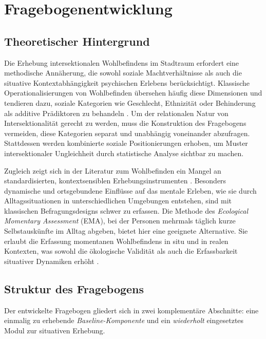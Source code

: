 \section{Fragebogenentwicklung}

\subsection{Theoretischer Hintergrund}

Die Erhebung intersektionalen Wohlbefindens im Stadtraum erfordert eine methodische Annäherung, die sowohl soziale Machtverhältnisse als auch die situative Kontextabhängigkeit psychischen Erlebens berücksichtigt. Klassische Operationalisierungen von Wohlbefinden übersehen häufig diese Dimensionen und tendieren dazu, soziale Kategorien wie Geschlecht, Ethnizität oder Behinderung als additive Prädiktoren zu behandeln \parencite{bauerIntersectionalityQuantitativeResearch2021}. Um der relationalen Natur von Intersektionalität gerecht zu werden, muss die Konstruktion des Fragebogens vermeiden, diese Kategorien separat und unabhängig voneinander abzufragen. Stattdessen werden kombinierte soziale Positionierungen erhoben, um Muster intersektionaler Ungleichheit durch statistische Analyse sichtbar zu machen.

Zugleich zeigt sich in der Literatur zum Wohlbefinden ein Mangel an standardisierten, kontextsensiblen Erhebungsinstrumenten \parencite{bautistaWhatWellbeingScoping2023}. Besonders dynamische und ortsgebundene Einflüsse auf das mentale Erleben, wie sie durch Alltagssituationen in unterschiedlichen Umgebungen entstehen, sind mit klassischen Befragungsdesigns schwer zu erfassen. Die Methode des \emph{Ecological Momentary Assessment} (EMA), bei der Personen mehrmals täglich kurze Selbstauskünfte im Alltag abgeben, bietet hier eine geeignete Alternative. Sie erlaubt die Erfassung momentanen Wohlbefindens in situ und in realen Kontexten, was sowohl die ökologische Validität als auch die Erfassbarkeit situativer Dynamiken erhöht \parencite{bakolisUrbanMindUsing2018}.

\subsection{Struktur des Fragebogens}

Der entwickelte Fragebogen gliedert sich in zwei komplementäre Abschnitte: eine einmalig zu erhebende \emph{Baseline-Komponente} und ein \emph{wiederholt} eingesetztes Modul zur situativen Erhebung.

